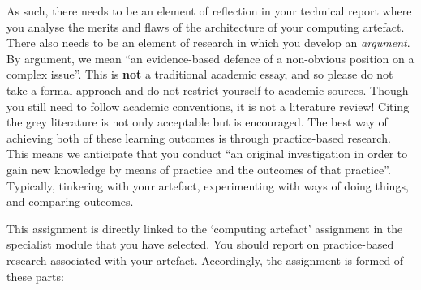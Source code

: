 \documentclass{../../fal_assignment}
\begin{document}
As such, there needs to be an element of reflection in your technical report where you analyse the merits and flaws of the architecture of your computing artefact. There also needs to be an element of research in which you develop an \textit{argument}. By argument,
we mean ``an evidence-based defence of a non-obvious position on a complex issue''. This is \textbf{not} a traditional academic essay, and so please do not take a formal approach and do not restrict yourself to academic sources. Though you still need to follow academic conventions, it is not a literature review! Citing the grey literature is not only acceptable but is encouraged. The best way of achieving both of these learning outcomes is through practice-based research. This means we anticipate that you conduct ``an original investigation in order to gain new knowledge by means of practice and the outcomes of that practice''. Typically, tinkering with your artefact, experimenting with ways of doing things, and comparing outcomes.

This assignment is directly linked to the `computing artefact' assignment in the specialist module that you have selected. You should report on practice-based research associated with your artefact. Accordingly, the assignment is formed of these parts:
\end{document}
